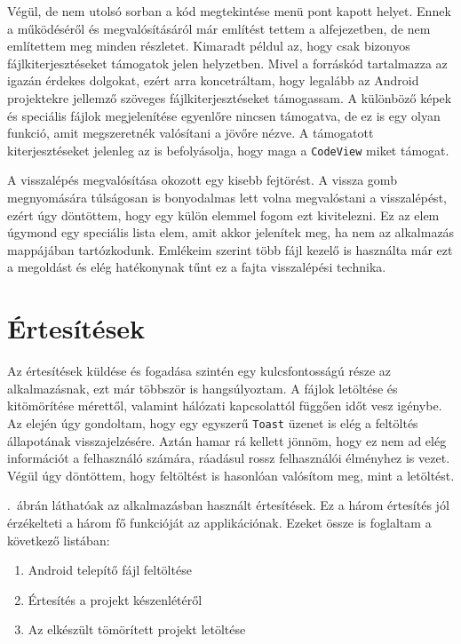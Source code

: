 \documentclass{thesis-ekf}
\theoremstyle{definition}
\theoremstyle{remark}
\begin{document}
Végül, de nem utolsó sorban a kód megtekintése menü pont kapott helyet.
Ennek a működéséről és megvalósításáról már említést tettem a  alfejezetben, de nem említettem meg minden részletet.
Kimaradt példul az, hogy csak bizonyos fájlkiterjesztéseket támogatok jelen helyzetben.
Mivel a forráskód tartalmazza az igazán érdekes dolgokat, ezért arra koncetráltam, hogy legalább az Android projektekre jellemző szöveges fájlkiterjesztéseket támogassam.
A különböző képek és speciális fájlok megjelenítése egyenlőre nincsen támogatva, de ez is egy olyan funkció, amit megszeretnék valósítani a jövőre nézve.
A támogatott kiterjesztéseket jelenleg az is befolyásolja, hogy maga a \texttt{CodeView} miket támogat.

A visszalépés megvalósítása okozott egy kisebb fejtörést.
A vissza gomb megnyomására túlságosan is bonyodalmas lett volna megvalóstani a visszalépést, ezért úgy döntöttem, hogy egy külön elemmel fogom ezt kivitelezni.
Ez az elem úgymond egy speciális lista elem, amit akkor jelenítek meg, ha nem az alkalmazás mappájában tartózkodunk.
Emlékeim szerint több fájl kezelő is használta már ezt a megoldást és elég hatékonynak tűnt ez a fajta visszalépési technika.

\section{Értesítések}\label{ertesitesek}

Az értesítések küldése és fogadása szintén egy kulcsfontosságú része az alkalmazásnak, ezt már többször is hangsúlyoztam.
A fájlok letöltése és kitömörítése mérettől, valamint hálózati kapcsolattól függően időt vesz igénybe.
Az elején úgy gondoltam, hogy egy egyszerű \texttt{Toast} üzenet is elég a feltöltés állapotának visszajelzésére.
Aztán hamar rá kellett jönnöm, hogy ez nem ad elég információt a felhasználó számára, ráadásul rossz felhasználói élményhez is vezet.
Végül úgy döntöttem, hogy feltöltést is hasonlóan valósítom meg, mint a letöltést.

.~ábrán láthatóak az alkalmazásban használt értesítések.
Ez a három értesítés jól érzékelteti a három fő funkcióját az applikációnak.
Ezeket össze is foglaltam a következő listában:

\begin{enumerate}
	\item Android telepítő fájl feltöltése
	\item Értesítés a projekt készenlétéről
	\item Az elkészült tömörített projekt letöltése
\end{enumerate}
\end{document}
